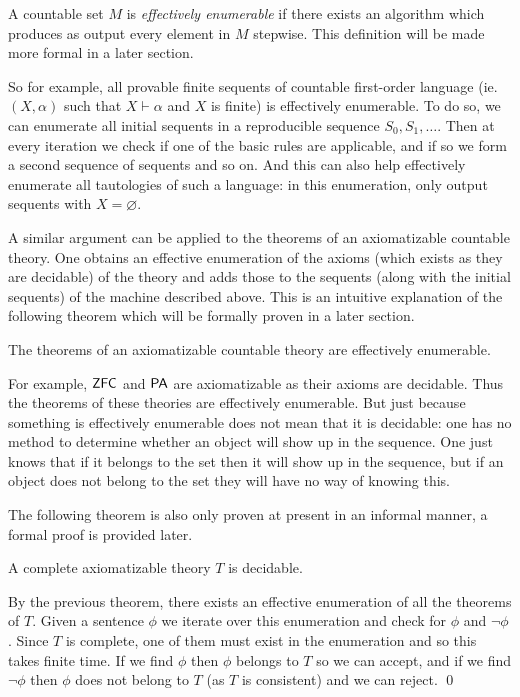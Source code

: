 \bdefn

    A countable set $M$ is {\it effectively enumerable} if there exists an algorithm which produces as output every element in $M$ stepwise.
    This definition will be made more formal in a later section.

\edefn

So for example, all provable finite sequents of countable first-order language (ie. $(X,\alpha)$ such that $X\vdash\alpha$ and $X$ is finite) is effectively enumerable.
To do so, we can enumerate all initial sequents in a reproducible sequence $S_0,S_1,\dots$.
Then at every iteration we check if one of the basic rules are applicable, and if so we form a second sequence of sequents and so on.
And this can also help effectively enumerate all tautologies of such a language: in this enumeration, only output sequents with $X=\varnothing$.

A similar argument can be applied to the theorems of an axiomatizable countable theory.
One obtains an effective enumeration of the axioms (which exists as they are decidable) of the theory and adds those to the sequents (along with the initial sequents) of the machine described above.
This is an intuitive explanation of the following theorem which will be formally proven in a later section.

\bthrm

    The theorems of an axiomatizable countable theory are effectively enumerable.

\ethrm

For example, ${\sf ZFC}$ and ${\sf PA}$ are axiomatizable as their axioms are decidable.
Thus the theorems of these theories are effectively enumerable.
But just because something is effectively enumerable does not mean that it is decidable: one has no method to determine whether an object will show up in the sequence.
One just knows that if it belongs to the set then it will show up in the sequence, but if an object does not belong to the set they will have no way of knowing this.

The following theorem is also only proven at present in an informal manner, a formal proof is provided later.

\bthrm

    A complete axiomatizable theory $T$ is decidable.

\ethrm

By the previous theorem, there exists an effective enumeration of all the theorems of $T$.
Given a sentence $\phi$ we iterate over this enumeration and check for $\phi$ and $\neg\phi$.
Since $T$ is complete, one of them must exist in the enumeration and so this takes finite time.
If we find $\phi$ then $\phi$ belongs to $T$ so we can accept, and if we find $\neg\phi$ then $\phi$ does not belong to $T$ (as $T$ is consistent) and we can reject.
\qed

